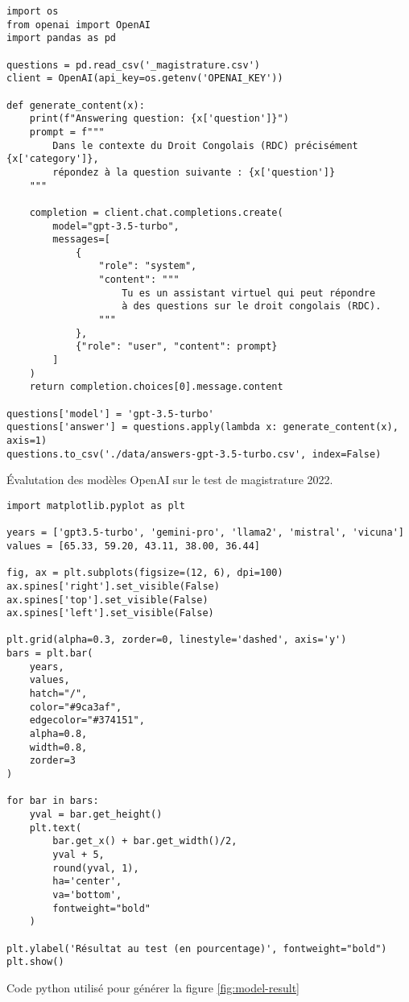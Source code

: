 \begin{listing}[!ht]
\begin{verbatim}
import os
from openai import OpenAI
import pandas as pd

questions = pd.read_csv('_magistrature.csv')
client = OpenAI(api_key=os.getenv('OPENAI_KEY'))

def generate_content(x):
    print(f"Answering question: {x['question']}")
    prompt = f"""
        Dans le contexte du Droit Congolais (RDC) précisément {x['category']},
        répondez à la question suivante : {x['question']}
    """

    completion = client.chat.completions.create(
        model="gpt-3.5-turbo",
        messages=[
            {
                "role": "system",
                "content": """
                    Tu es un assistant virtuel qui peut répondre 
                    à des questions sur le droit congolais (RDC).
                """
            },
            {"role": "user", "content": prompt}
        ]
    )
    return completion.choices[0].message.content

questions['model'] = 'gpt-3.5-turbo'
questions['answer'] = questions.apply(lambda x: generate_content(x), axis=1)
questions.to_csv('./data/answers-gpt-3.5-turbo.csv', index=False)
\end{verbatim}
\caption{Évalutation des modèles OpenAI sur le test de magistrature 2022.}
\label{appendix:code:python:gpt-3-evaluation}
\end{listing}

\begin{listing}[!ht]
\begin{verbatim}
import matplotlib.pyplot as plt

years = ['gpt3.5-turbo', 'gemini-pro', 'llama2', 'mistral', 'vicuna']
values = [65.33, 59.20, 43.11, 38.00, 36.44]

fig, ax = plt.subplots(figsize=(12, 6), dpi=100)
ax.spines['right'].set_visible(False)
ax.spines['top'].set_visible(False)
ax.spines['left'].set_visible(False)

plt.grid(alpha=0.3, zorder=0, linestyle='dashed', axis='y')
bars = plt.bar(
    years, 
    values, 
    hatch="/", 
    color="#9ca3af", 
    edgecolor="#374151", 
    alpha=0.8, 
    width=0.8, 
    zorder=3
)

for bar in bars:
    yval = bar.get_height()
    plt.text(
        bar.get_x() + bar.get_width()/2, 
        yval + 5, 
        round(yval, 1), 
        ha='center', 
        va='bottom', 
        fontweight="bold"
    )

plt.ylabel('Résultat au test (en pourcentage)', fontweight="bold")
plt.show()
\end{verbatim}
\caption{Code python utilisé pour générer la figure \ref{fig:model-result}}
\label{appendix:code:python:model-result}
\end{listing}
